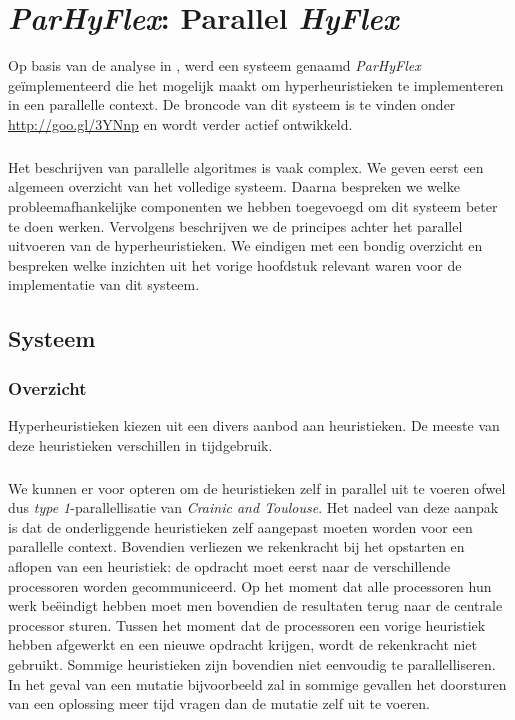 \chapter{\emph{ParHyFlex}: Parallel \emph{HyFlex}}


Op basis van de analyse in , werd een systeem genaamd \emph{ParHyFlex} ge\"implementeerd die het mogelijk maakt om hyperheuristieken te implementeren in een parallelle context. De broncode van dit systeem is te vinden onder \url{http://goo.gl/3YNnp} en wordt verder actief ontwikkeld.
\paragraph{}
Het beschrijven van parallelle algoritmes is vaak complex. We geven eerst een algemeen overzicht van het volledige systeem. Daarna bespreken we welke probleemafhankelijke componenten we hebben toegevoegd om dit systeem beter te doen werken. Vervolgens beschrijven we de principes achter het parallel uitvoeren van de hyperheuristieken. We eindigen met een bondig overzicht en bespreken welke inzichten uit het vorige hoofdstuk relevant waren voor de implementatie van dit systeem.

\section{Systeem}

\subsection{Overzicht}

Hyperheuristieken kiezen uit een divers aanbod aan heuristieken. De meeste van deze heuristieken verschillen in tijdgebruik.

\paragraph{}
We kunnen er voor opteren om de heuristieken zelf in parallel uit te voeren ofwel dus \emph{type 1}-parallellisatie van \emph{Crainic and Toulouse}\cite{crainicAndToulouse}. Het nadeel van deze aanpak is dat de onderliggende heuristieken zelf aangepast moeten worden voor een parallelle context. Bovendien verliezen we rekenkracht bij het opstarten en aflopen van een heuristiek: de opdracht moet eerst naar de verschillende processoren worden gecommuniceerd. Op het moment dat alle processoren hun werk be\"eindigt hebben moet men bovendien de resultaten terug naar de centrale processor sturen. Tussen het moment dat de processoren een vorige heuristiek hebben afgewerkt en een nieuwe opdracht krijgen, wordt de rekenkracht niet gebruikt. Sommige heuristieken zijn bovendien niet eenvoudig te parallelliseren. In het geval van een mutatie bijvoorbeeld zal in sommige gevallen het doorsturen van een oplossing meer tijd vragen dan de mutatie zelf uit te voeren.

